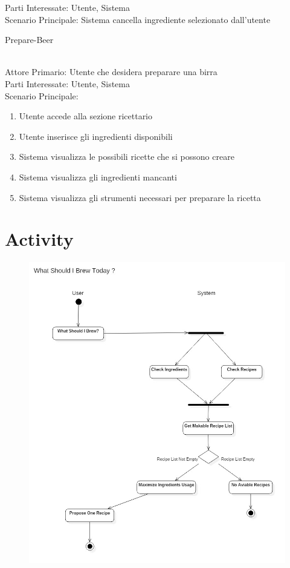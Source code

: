 \documentclass[12pt]{article}
\begin{document}
Parti Interessate: Utente, Sistema\\
Scenario Principale: Sistema cancella ingrediente selezionato dall'utente
\bigskip
\\
\begin{itshape}
Prepare-Beer
\end{itshape}\\
Attore Primario: Utente che desidera preparare una birra\\ 
Parti Interessate: Utente, Sistema\\
Scenario Principale:
\begin{enumerate}
\item Utente accede alla sezione ricettario
\item Utente inserisce gli ingredienti disponibili
\item Sistema visualizza le possibili ricette che si possono creare
\item Sistema visualizza gli ingredienti mancanti
\item Sistema visualizza gli strumenti necessari per preparare la ricetta
\end{enumerate}
\section{Activity}

\begin{figure}[H]
\includegraphics[scale=0.5]{ActivityDiagram.jpg}
\centering
\end{figure}
\end{document}
